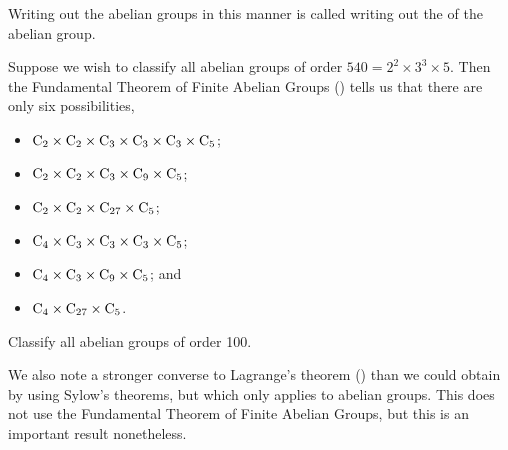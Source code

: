 Writing out the abelian groups in this manner is called writing out the  of the abelian group.

\begin{example}
    Suppose we wish to classify all abelian groups of order $540 = 2^2 \times 3^3 \times 5$. Then the Fundamental Theorem of Finite Abelian Groups () tells us that there are only six possibilities,
    \begin{multicols}{2}
        \begin{itemize}
            \item $\mathrm{C}_{2} \times \mathrm{C}_{2} \times \mathrm{C}_{3} \times \mathrm{C}_{3} \times \mathrm{C}_{3} \times \mathrm{C}_{5}$;
            \item $\mathrm{C}_{2} \times \mathrm{C}_{2} \times \mathrm{C}_{3} \times \mathrm{C}_{9} \times \mathrm{C}_{5}$;
            \item $\mathrm{C}_{2} \times \mathrm{C}_{2} \times \mathrm{C}_{27} \times \mathrm{C}_{5}$;
            \item $\mathrm{C}_{4} \times \mathrm{C}_{3} \times \mathrm{C}_{3} \times \mathrm{C}_{3} \times \mathrm{C}_{5}$;
            \item $\mathrm{C}_{4} \times \mathrm{C}_{3} \times \mathrm{C}_{9} \times \mathrm{C}_{5}$; and
            \item $\mathrm{C}_{4} \times \mathrm{C}_{27} \times \mathrm{C}_{5}$.
        \end{itemize}
    \end{multicols}
\end{example}

\begin{exercise}
    Classify all abelian groups of order 100.
\end{exercise}

We also note a stronger converse to Lagrange's theorem () than we could obtain by using Sylow's theorems, but which only applies to abelian groups. This does not use the Fundamental Theorem of Finite Abelian Groups, but this is an important result nonetheless.

